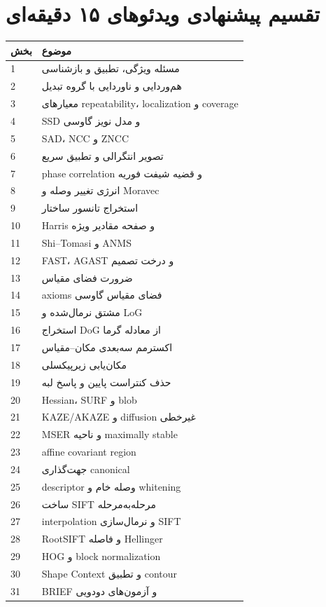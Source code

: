 \documentclass[12pt,openany,oneside]{book}
\begin{document}
\section{تقسیم پیشنهادی ویدئوهای ۱۵ دقیقه‌ای}
\begin{longtable}{p{12mm}p{116mm}}
\toprule
بخش & موضوع \\
\midrule
1 & مسئله ویژگی، تطبیق و بازشناسی \\
2 & هم‌وردایی و ناوردایی با گروه تبدیل \\
3 & معیارهای repeatability، localization و coverage \\
4 & SSD و مدل نویز گاوسی \\
5 & SAD، NCC و ZNCC \\
6 & تصویر انتگرالی و تطبیق سریع \\
7 & phase correlation و قضیه شیفت فوریه \\
8 & انرژی تغییر وصله و Moravec \\
9 & استخراج تانسور ساختار \\
10 & Harris و صفحه مقادیر ویژه \\
11 & Shi--Tomasi و ANMS \\
12 & FAST، AGAST و درخت تصمیم \\
13 & ضرورت فضای مقیاس \\
14 & axioms فضای مقیاس گاوسی \\
15 & مشتق نرمال‌شده و LoG \\
16 & استخراج DoG از معادله گرما \\
17 & اکسترمم سه‌بعدی مکان--مقیاس \\
18 & مکان‌یابی زیرپیکسلی \\
19 & حذف کنتراست پایین و پاسخ لبه \\
20 & Hessian، SURF و blob \\
21 & KAZE/AKAZE و diffusion غیرخطی \\
22 & MSER و ناحیه maximally stable \\
23 & affine covariant region \\
24 & جهت‌گذاری canonical \\
25 & descriptor وصله خام و whitening \\
26 & ساخت SIFT مرحله‌به‌مرحله \\
27 & interpolation و نرمال‌سازی SIFT \\
28 & RootSIFT و فاصله Hellinger \\
29 & HOG و block normalization \\
30 & Shape Context و تطبیق contour \\
31 & BRIEF و آزمون‌های دودویی \\

\end{longtable}
\end{document}
